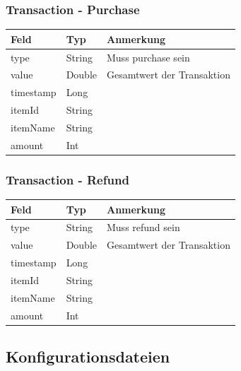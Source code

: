 \documentclass[a4paper, 11pt]{article}
\begin{document}
\subsubsection*{Transaction - Purchase}
\label{subsubsec:attachments:schemas:purchase}
\begin{table}[H]
	\centering
	\begin{tabular}{@{}lll@{}}
		Feld      & Typ    & Anmerkung                       \\ \toprule
		type      & String & Muss \glqq purchase\grqq{} sein \\ \midrule
		value     & Double & Gesamtwert der Transaktion      \\ \midrule
		timestamp & Long   &                                 \\ \midrule
		itemId    & String &                                 \\ \midrule
		itemName  & String &                                 \\ \midrule
		amount    & Int    &                                 \\ \bottomrule
	\end{tabular}
	\label{tab:attachments:schemas:purchase}
\end{table}

\subsubsection*{Transaction - Refund}
\label{subsubsec:attachments:schemas:refund}
\begin{table}[H]
	\centering
	\begin{tabular}{@{}lll@{}}
		Feld      & Typ    & Anmerkung                     \\ \toprule
		type      & String & Muss \glqq refund\grqq{} sein \\ \midrule
		value     & Double & Gesamtwert der Transaktion    \\ \midrule
		timestamp & Long   &                               \\ \midrule
		itemId    & String &                               \\ \midrule
		itemName  & String &                               \\ \midrule
		amount    & Int    &                               \\ \bottomrule
	\end{tabular}
	\label{tab:attachments:schemas:refund}
\end{table}

\subsection*{Konfigurationsdateien}
\label{subsec:attachments}
\end{document}
